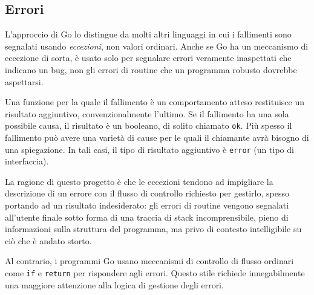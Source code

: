 \documentclass[../../thesis.tex]{subfiles}
\begin{document}
    \subsection{Errori}\label{subsec:errori}
    L'approccio di Go lo distingue da molti altri linguaggi in cui i fallimenti sono segnalati usando \textit{eccezioni}, non valori ordinari.
    Anche se Go ha un meccanismo di eccezione di sorta, è usato solo per segnalare errori veramente inaspettati che indicano un bug, non gli errori di routine che un programma robusto dovrebbe aspettarsi.
    \hfill \vspace{12pt}

    Una funzione per la quale il fallimento è un comportamento atteso restituisce un risultato aggiuntivo, convenzionalmente l'ultimo.
    Se il fallimento ha una sola possibile causa, il risultato è un booleano, di solito chiamato \verb"ok".
    Più spesso il fallimento può avere una varietà di cause per le quali il chiamante avrà bisogno di una spiegazione.
    In tali casi, il tipo di risultato aggiuntivo è \verb"error" (un tipo di interfaccia).
    \hfill \vspace{12pt}

    La ragione di questo progetto è che le eccezioni tendono ad impigliare la descrizione di un errore con il flusso di controllo richiesto per gestirlo, spesso portando ad un risultato indesiderato: gli errori di routine vengono segnalati all'utente finale sotto forma di una traccia di stack incomprensibile, pieno di informazioni sulla struttura del programma, ma privo di contesto intelligibile su ciò che è andato storto.
    \hfill \vspace{12pt}

    Al contrario, i programmi Go usano meccanismi di controllo di flusso ordinari come \verb"if" e \verb"return" per rispondere agli errori.
    Questo stile richiede innegabilmente una maggiore attenzione alla logica di gestione degli errori.
\end{document}
